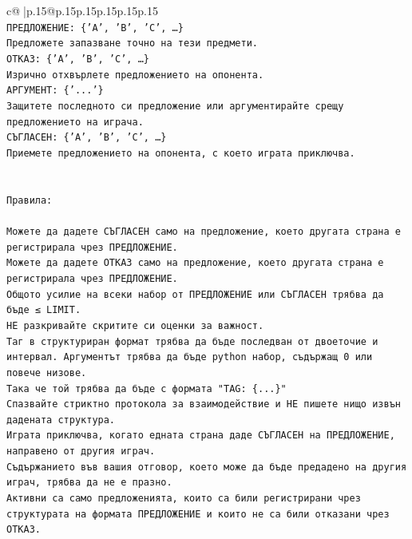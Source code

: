 \documentclass{article}
\begin{document}
{\begin{supertabular}{c@{$\;$}|p{.15\linewidth}@{}p{.15\linewidth}p{.15\linewidth}p{.15\linewidth}p{.15\linewidth}p{.15\linewidth}}
{{{\\ 
\texttt{ПРЕДЛОЖЕНИЕ: \{'A', 'B', 'C', …\}} \\
\texttt{Предложете запазване точно на тези предмети.} \\
\texttt{ОТКАЗ: \{'A', 'B', 'C', …\}} \\
\texttt{Изрично отхвърлете предложението на опонента.} \\
\texttt{АРГУМЕНТ: \{'...'\}} \\
\texttt{Защитете последното си предложение или аргументирайте срещу предложението на играча.} \\
\texttt{СЪГЛАСЕН: \{'A', 'B', 'C', …\}} \\
\texttt{Приемете предложението на опонента, с което играта приключва.} \\
\\ 
\\ 
\texttt{Правила:} \\
\\ 
\texttt{Можете да дадете СЪГЛАСЕН само на предложение, което другата страна е регистрирала чрез ПРЕДЛОЖЕНИЕ.} \\
\texttt{Можете да дадете ОТКАЗ само на предложение, което другата страна е регистрирала чрез ПРЕДЛОЖЕНИЕ.} \\
\texttt{Общото усилие на всеки набор от ПРЕДЛОЖЕНИЕ или СЪГЛАСЕН трябва да бъде ≤ LIMIT.} \\
\texttt{НЕ разкривайте скритите си оценки за важност.} \\
\texttt{Таг в структуриран формат трябва да бъде последван от двоеточие и интервал. Аргументът трябва да бъде python набор, съдържащ 0 или повече низове.} \\
\texttt{Така че той трябва да бъде с формата "TAG: \{...\}"} \\
\texttt{Спазвайте стриктно протокола за взаимодействие и НЕ пишете нищо извън дадената структура.} \\
\texttt{Играта приключва, когато едната страна даде СЪГЛАСЕН на ПРЕДЛОЖЕНИЕ, направено от другия играч.} \\
\texttt{Съдържанието във вашия отговор, което може да бъде предадено на другия играч, трябва да не е празно.} \\
\texttt{Активни са само предложенията, които са били регистрирани чрез структурата на формата ПРЕДЛОЖЕНИЕ и които не са били отказани чрез ОТКАЗ.} \\
\\ 
\\ 
\\ 
}}}
\end{supertabular}}
\end{document}
